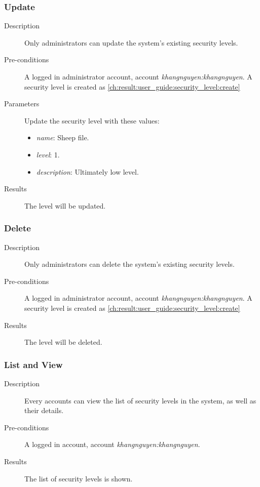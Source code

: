 \subsubsection{Update}
\label{ch:result:user_guide:security_level:update}

\begin{description}
\item[Description] Only administrators can update the system's existing security levels.
\item[Pre-conditions] A logged in administrator account, \eg account \emph{khangnguyen:khangnguyen}.
A security level is created as \autoref{ch:result:user_guide:security_level:create}
\item[Parameters] Update the security level with these values:
\begin{itemize}
\item \emph{name}: Sheep file.
\item \emph{level}: 1.
\item \emph{description}: Ultimately low level.
\end{itemize}
\item[Results] The level will be updated.
\end{description}

\subsubsection{Delete}
\label{ch:result:user_guide:security_level:delete}

\begin{description}
\item[Description] Only administrators can delete the system's existing security levels.
\item[Pre-conditions] A logged in administrator account, \eg account \emph{khangnguyen:khangnguyen}.
A security level is created as \autoref{ch:result:user_guide:security_level:create}
\item[Results] The level will be deleted.
\end{description}

\subsubsection{List and View}
\label{ch:result:user_guide:security_level:list}

\begin{description}
\item[Description] Every accounts can view the list of security levels in the system, as well as their details.
\item[Pre-conditions] A logged in account, \eg account \emph{khangnguyen:khangnguyen}.
\item[Results] The list of security levels is shown.
\end{description}

